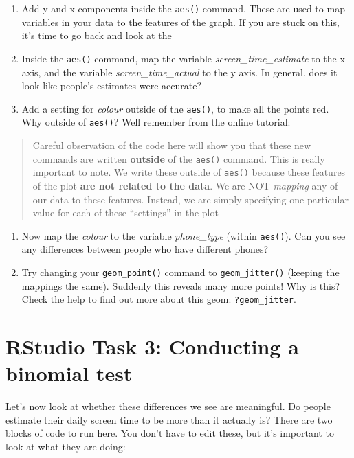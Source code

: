 \documentclass[
]{book}
\begin{document}
\begin{enumerate}
\def\labelenumi{\arabic{enumi}.}
\setcounter{enumi}{4}
\item
  Add y and x components inside the \texttt{aes()} command. These are used to map variables in your data to the features of the graph. If you are stuck on this, it's time to go back and look at the
\item
  Inside the \texttt{aes()} command, map the variable \emph{screen\_time\_estimate} to the x axis, and the variable \emph{screen\_time\_actual} to the y axis. In general, does it look like people's estimates were accurate?
\item
  Add a setting for \emph{colour} outside of the \texttt{aes()}, to make all the points red. Why outside of \texttt{aes()}? Well remember from the online tutorial:
\end{enumerate}

\begin{quote}
Careful observation of the code here will show you that these new commands are written \textbf{outside} of the \texttt{aes()} command. This is really important to note. We write these outside of \texttt{aes()} because these features of the plot \textbf{are not related to the data}. We are NOT \emph{mapping} any of our data to these features. Instead, we are simply specifying one particular value for each of these ``settings'' in the plot
\end{quote}

\begin{enumerate}
\def\labelenumi{\arabic{enumi}.}
\setcounter{enumi}{7}
\item
  Now map the \emph{colour} to the variable \emph{phone\_type} (within \texttt{aes()}). Can you see any differences between people who have different phones?
\item
  Try changing your \texttt{geom\_point()} command to \texttt{geom\_jitter()} (keeping the mappings the same). Suddenly this reveals many more points! Why is this? Check the help to find out more about this geom: \texttt{?geom\_jitter}.
\end{enumerate}

\hypertarget{rstudio-task-3-conducting-a-binomial-test}{%
\section{RStudio Task 3: Conducting a binomial test}\label{rstudio-task-3-conducting-a-binomial-test}}

Let's now look at whether these differences we see are meaningful. Do people estimate their daily screen time to be more than it actually is? There are two blocks of code to run here. You don't have to edit these, but it's important to look at what they are doing:
\end{document}
